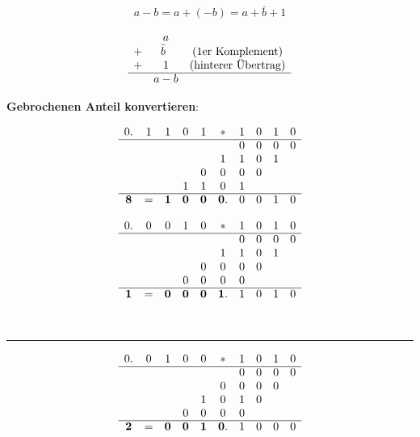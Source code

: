 \documentclass{article}
\begin{document}
\[
  a - b = a + (-b) = a + \bar{b} + 1
\]

\[
  \begin{array}{ccc}
      & a \\
    + & \bar{b} \hspace{5pt} &\text{(1er Komplement)} \\
    + & 1                    &\text{(hinterer Übertrag)}\\
    \cline{1-3}
      & a - b \\
  \end{array}
\]

\textbf{Gebrochenen Anteil konvertieren}:

\begin{minipage}[t]{.4\textwidth}
  \[
    \begin{array}{cccc cccc cc}
      0.&1&1&0&1 &* &1&0&1&0 \\
      \cline{0-9}
        & & & &  &  &0&0&0&0 \\
        & & & &  &1 &1&0&1 \\
        & & & &0 &0 &0&0 \\
        & & &1&1 &0 &1 \\
      \cline{0-9}
      \bm{8}&=&\bm{1}&\bm{0}&\bm{0}&\bm{0}.&0&0&1&0 \\
    \end{array}
  \]
\end{minipage}
\hfill
\vrule
\hfill
\begin{minipage}[t]{.4\textwidth}
  \[
    \begin{array}{cccc cccc cc}
      0.&0&0&1&0 &* &1&0&1&0 \\
      \cline{0-9}
        & & & &  &  &0&0&0&0 \\
        & & & &  &1 &1&0&1 \\
        & & & &0 &0 &0&0 \\
        & & &0&0 &0 &0 \\
      \cline{0-9}
      \bm{1}&=&\bm{0}&\bm{0}&\bm{0}&\bm{1}.&1&0&1&0 \\
    \end{array}
  \]
\end{minipage}  \\
\hrule
\begin{minipage}[t]{.4\textwidth}
  \[
    \begin{array}{cccc cccc cc}
      0.&0&1&0&0 &* &1&0&1&0 \\
      \cline{0-9}
        & & & &  &  &0&0&0&0 \\
        & & & &  &0 &0&0&0 \\
        & & & &1 &0 &1&0 \\
        & & &0&0 &0 &0 \\
      \cline{0-9}
      \bm{2}&=&\bm{0}&\bm{0}&\bm{1}&\bm{0}.&1&0&0&0 \\
    \end{array}
  \]
\end{minipage}
\end{document}
